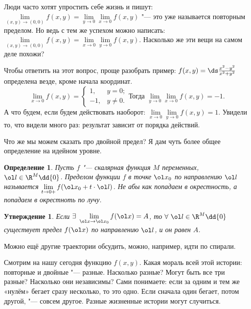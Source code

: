 \documentclass[a4paper,10pt,twoside]{article}
\newtheorem{Def}{Определение}[section]
\newtheorem{Ut}{Утверждение}[section]
\begin{document}
	 Люди часто хотят упростить себе жизнь и пишут: $\lim\limits_{(x,y)\to (0,0)}f(x,y) = \lim\limits_{y\to 0}\lim\limits_{x\to 0}f(x,y)$ "---
	 это уже называется повторным пределом. Но ведь с тем же успехом можно написать: $\lim\limits_{(x,y)\to (0,0)}f(x,y) = \lim\limits_{x\to 0}\lim\limits_{y\to 0}f(x,y)$.
	 Насколько же эти вещи на самом деле похожи?
	 
	 Чтобы ответить на этот вопрос, проще разобрать пример: $f(x,y)=\ds\frac{x^2-y^2}{x^2+y^2}$ определена везде, кроме начала координат.
	 \[\lim\limits_{x\to 0}f(x,y) = \begin{cases}1,&y=0;\\-1,&y\neq 0.\end{cases}\text{Тогда }\lim\limits_{y\to 0}\lim\limits_{x\to 0}f(x,y) = -1.\]
	 А что будем, если будем действовать наоборот: $\lim\limits_{x\to 0}\lim\limits_{y\to 0}f(x,y) = 1$.
	 Увидели то, что видели много раз: результат зависит от порядка действий.
	 
	 Что же мы можем сказать про двойной предел? Я дам чуть более общее определение на идейном уровне.
	 \begin{Def}
	 Пусть $f$ "--- скалярная функция $M$ переменных, $\ol l\in \R^M\dd\{0\}$. Пределом функции $f$ в точке $\ol x_0$ по направлению $\ol l$ называется
	 $\lim\limits_{t\to 0+}f(\ol x_0 + t\cdot \ol l)$. Не абы как попадаем в окрестность, а попадаем в окрестноть по лучу.
	 \end{Def}
	 \begin{Ut}
	 Если $\exists\ \lim\limits_{\ol x\to \ol x_0}f(\ol x) = A$, то $\forall\ \ol l\in\R^M\dd\{0\}$ существует предел $f(\ol x)$ по направлению $\ol l$, и он равен $A$.
	 \end{Ut}
	 Можно ещё другие траектории обсудить, можно, например, идти по спирали.
	 
	 Смотрим на нашу сегодня функцию $f(x,y)$.
	 Какая мораль всей этой истории: повторные и двойные "--- разные. Насколько разные? Могут быть все три разные? Насколько они независимы?
	 Сами понимаете: если за одним и тем же «нулём» бегает сразу несколько, то это одно. Если сначала один бегает, потом другой, "--- совсем другое. Разные
	 жизненные истории могут случиться.
	 
\end{document}
